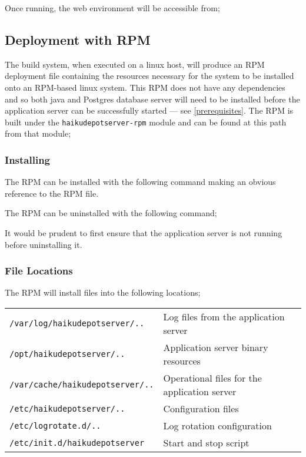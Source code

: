 Once running, the web environment will be accessible from;


\subsection{Deployment with RPM}

The build system, when executed on a linux host, will produce an RPM deployment file containing the resources necessary for the system to be installed onto an RPM-based linux system.  This RPM does not have any dependencies and so both java and Postgres database server will need to be installed before the application server can be successfully started --- see \ref{prerequisites}.  The RPM is built under the {\tt haikudepotserver-rpm} module and can be found at this path from that module;


\subsubsection{Installing}

The RPM can be installed with the following command making an obvious reference to the RPM file.


The RPM can be uninstalled with the following command;


It would be prudent to first ensure that the application server is not running before uninstalling it.

\subsubsection{File Locations}

The RPM will install files into the following locations;

\begin{tabular}{|l|l|}
\hline
{\tt /var/log/haikudepotserver/..} & Log files from the application server \\
{\tt /opt/haikudepotserver/..} & Application server binary resources \\
{\tt /var/cache/haikudepotserver/..} & Operational files for the application server \\
{\tt /etc/haikudepotserver/..} & Configuration files \\
{\tt /etc/logrotate.d/..} & Log rotation configuration \\
{\tt /etc/init.d/haikudepotserver} & Start and stop script \\
\hline
\end{tabular}

